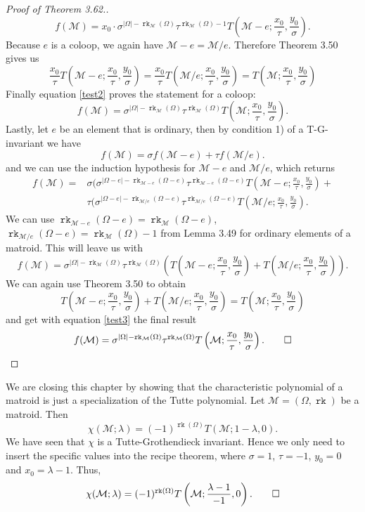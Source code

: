 \documentclass[12pt,a4paper, twoside, autooneside=false]{scrartcl}
\theoremstyle{definition}
\theoremstyle{remark}
\numberwithin{equation}{section}
\DeclareMathOperator{\rk}{\mathtt{rk}}
\newcommand{\M}{\mathcal{M}} %
\begin{document}
\begin{proof}[Proof of Theorem 3.62.]
\begin{equation}\label{test2}
f(\M) = x_0 \cdot \sigma^{|\Omega| - \rk_{\M}(\Omega)} \tau^{\rk_{\M}(\Omega) - 1} T\left(\M - e; \frac{x_0}{\tau}, \frac{y_0}{\sigma}\right). 
\end{equation}
Because $e$ is a coloop, we again have $\M - e = \M / e$. Therefore Theorem 3.50 gives us 
\[
\frac{x_0}{\tau} T\left(\M - e; \frac{x_0}{\tau}, \frac{y_0}{\sigma}\right) = \frac{x_0}{\tau}  T\left(\M / e; \frac{x_0}{\tau}, \frac{y_0}{\sigma}\right) = T\left(\M; \frac{x_0}{\tau}, \frac{y_0}{\sigma}\right)
\] 
Finally equation \eqref{test2} proves the statement for a coloop: 
\[
f(\M) = \sigma^{|\Omega| - \rk_{\M}(\Omega)} \tau^{\rk_{\M}(\Omega)} T\left(\M; \frac{x_0}{\tau}, \frac{y_0}{\sigma}\right).
\]
Lastly, let $e$ be an element that is ordinary, then by condition 1) of a T-G-invariant we have
\[
f(\M) = \sigma f(\M - e) + \tau f(\M / e).
\] 
and we can use the induction hypothesis for $\M - e$ and $\M /e$, which returns
\begin{align*}
f(\M) = &\sigma( \sigma^{|\Omega - e| - \rk_{\M - e}(\Omega - e)} \tau^{\rk_{\M - e}(\Omega - e)} T\left(\M - e; \frac{x_0}{\tau}, \frac{y_0}{\sigma}\right) + \\ &\tau (\sigma^{|\Omega - e| - \rk_{\M / e}(\Omega - e)}\tau^{\rk_{\M / e}(\Omega - e)}T\left(\M / e; \frac{x_0}{\tau}, \frac{y_0}{\sigma}\right).
\end{align*}
We can use $\rk_{\M - e}(\Omega - e) = \rk_\M(\Omega -e)$, $\rk_{\M / e}(\Omega - e) = \rk_{\M}(\Omega) - 1$ from Lemma 3.49 for ordinary elements of a matroid. This will leave us with 
\begin{equation} \label{test3}
f(\M) = \sigma^{|\Omega| - \rk_{\M}(\Omega)}\tau^{\rk_{\M}(\Omega)} \left(T\left(\M - e;  \frac{x_0}{\tau}, \frac{y_0}{\sigma}\right) + T\left(\M / e;  \frac{x_0}{\tau}, \frac{y_0}{\sigma}\right)\right).
\end{equation} We can again use Theorem 3.50 to obtain
\[
T\left(\M - e;  \frac{x_0}{\tau}, \frac{y_0}{\sigma}\right) + T(\M / e;  \frac{x_0}{\tau}, \frac{y_0}{\sigma}) = T\left(\M; \frac{x_0}{\tau}, \frac{y_0}{\sigma}\right)
\]
and get with equation \eqref{test3} the final result
\[
f(\M) = \sigma^{|\Omega| - \rk_{\M}(\Omega)}\tau^{\rk_{\M}(\Omega)} T\left(\M; \frac{x_0}{\tau}, \frac{y_0}{\sigma}\right). \qedhere
\]
\end{proof}
We are closing this chapter by showing that the characteristic polynomial of a matroid is just a specialization of the Tutte polynomial. Let $\M = (\Omega, \rk)$ be a matroid. Then
\[
\chi(\M; \lambda) = (-1)^{\rk(\Omega)}T(\M; 1 - \lambda, 0).
\]
We have seen that $\chi$ is a Tutte-Grothendieck invariant. Hence we only need to insert the specific values into the recipe theorem, where $\sigma = 1$, $\tau =  -1$, $y_0 = 0$ and $x_0 = \lambda - 1$. Thus, 
\[
\chi(\M; \lambda) = (-1)^{\rk(\Omega)}T\left(\M; \frac{\lambda - 1}{-1}, 0\right). \qedhere
\]
\newpage
\end{document}
